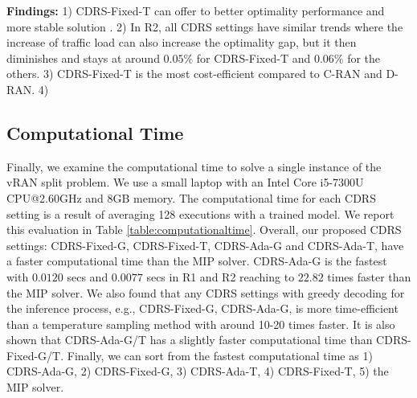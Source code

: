%

\textbf{Findings:} 1) CDRS-Fixed-T can offer to better optimality performance and more stable solution . 2) In R2, all CDRS settings have similar trends where the increase of traffic load can also increase the optimality gap, but it then diminishes and stays at around $0.05\%$ for CDRS-Fixed-T and $0.06\%$ for the others. 3)  CDRS-Fixed-T is the most cost-efficient compared to C-RAN and D-RAN. 4) 

\vspace{-2mm}
\subsection{Computational Time}
\vspace{-1mm}

Finally, we examine the computational time to solve a single instance of the vRAN split problem. We use a small laptop with an Intel Core i5-7300U CPU@2.60GHz and 8GB memory. The computational time for each CDRS setting is a result of averaging 128 executions with a trained model. We report this evaluation in Table \ref{table:computationaltime}.  Overall, our proposed CDRS settings: CDRS-Fixed-G, CDRS-Fixed-T, CDRS-Ada-G and CDRS-Ada-T, have a faster computational time than the MIP solver. CDRS-Ada-G is the fastest with $0.0120$ secs and $0.0077$ secs in R1 and R2 reaching to $22.82$ times faster than the MIP solver. We also found that any CDRS settings with greedy decoding for the inference process, e.g., CDRS-Fixed-G, CDRS-Ada-G, is more time-efficient than a temperature sampling method with around 10-20 times faster. It is also shown that CDRS-Ada-G/T has a slightly faster computational time than CDRS-Fixed-G/T. Finally, we can sort from the fastest computational time as 1) CDRS-Ada-G, 2) CDRS-Fixed-G, 3) CDRS-Ada-T, 4) CDRS-Fixed-T, 5) the MIP solver.

